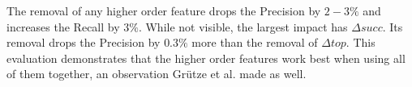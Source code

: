 The removal of any higher order feature drops the Precision by $2-3\%$ and increases the Recall by $3\%$. While not visible, the largest impact has $\Delta succ$. Its removal drops the Precision by $0.3\%$ more than the removal of $\Delta top$. This evaluation demonstrates that the higher order features work best when using all of them together, an observation Grütze et al. \cite{coheel} made as well.


